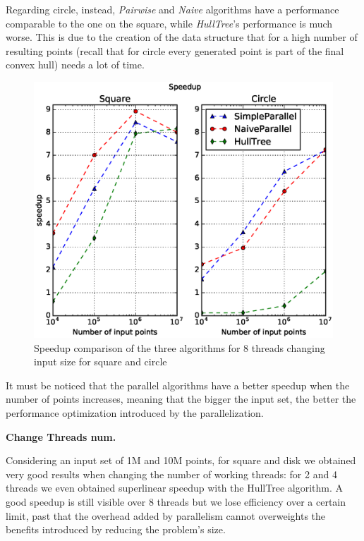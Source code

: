 \documentclass[letterpaper]{article}
\newcommand{\mypar}[1]{{\bf #1.}}
\begin{document}
Regarding circle, instead, \textit{Pairwise} and \textit{Naive} algorithms have a performance comparable to the one on the square, while \textit{HullTree}'s performance is much worse.
This is due to the creation of the data structure that for a high number of resulting points (recall that for circle every generated point is part of the final convex hull) needs a lot of time.

\begin{figure}[!ht]\centering
  \includegraphics[scale=0.33]{./plots/speedup_points.eps}
  \caption{Speedup comparison of the three algorithms for 8 threads changing input size for square and circle\label{Input size speedup}}
\end{figure}

It must be noticed that the parallel algorithms have a better speedup when the number of points increases, meaning that the bigger the input set, the better the performance optimization introduced by the parallelization.

\mypar{Change Threads num}

Considering an input set of 1M and 10M points, for square and disk we obtained very good results when changing the number of working threads: for 2 and 4 threads we even obtained superlinear speedup with the HullTree algorithm.
A good speedup is still visible over 8 threads but we lose efficiency over a certain limit, past that the overhead added by parallelism cannot overweights the benefits introduced by reducing the problem's size.
\end{document}
